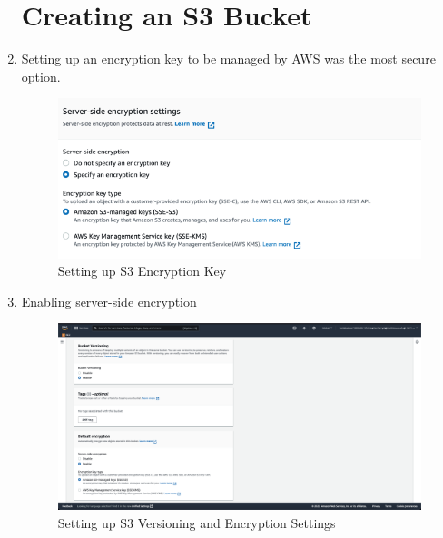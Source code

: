 \begin{enumerate}
    \section{Creating an S3 Bucket}

        \item Setting up an encryption key to be managed by AWS was the most secure option.
            \begin{figure}[H]
                \centering
                \includegraphics[width=\textwidth]{resources/s3/s3_encryption.PNG}
                \caption{Setting up S3 Encryption Key}
                \label{fig:s3-image-2}
            \end{figure}


    \item Enabling server-side encryption
        \begin{figure}[H]
            \centering
            \includegraphics[width=\textwidth]{resources/s3/s3-versioning-encrypting.png}
            \caption{Setting up S3 Versioning and Encryption Settings}
            \label{fig:s3-versioning-encrypting}
        \end{figure}


\end{enumerate}
